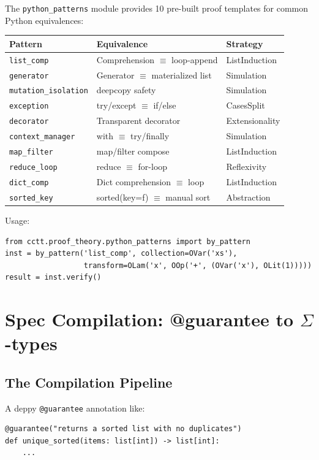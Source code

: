 The \texttt{python\_patterns} module provides 10 pre-built proof templates
for common Python equivalences:

\begin{center}
\begin{tabular}{lll}
\toprule
Pattern & Equivalence & Strategy \\
\midrule
\texttt{list\_comp} & Comprehension $\equiv$ loop-append & ListInduction \\
\texttt{generator} & Generator $\equiv$ materialized list & Simulation \\
\texttt{mutation\_isolation} & deepcopy safety & Simulation \\
\texttt{exception} & try/except $\equiv$ if/else & CasesSplit \\
\texttt{decorator} & Transparent decorator & Extensionality \\
\texttt{context\_manager} & with $\equiv$ try/finally & Simulation \\
\texttt{map\_filter} & map/filter compose & ListInduction \\
\texttt{reduce\_loop} & reduce $\equiv$ for-loop & Reflexivity \\
\texttt{dict\_comp} & Dict comprehension $\equiv$ loop & ListInduction \\
\texttt{sorted\_key} & sorted(key=f) $\equiv$ manual sort & Abstraction \\
\bottomrule
\end{tabular}
\end{center}

Usage:
\begin{lstlisting}
from cctt.proof_theory.python_patterns import by_pattern
inst = by_pattern('list_comp', collection=OVar('xs'),
                  transform=OLam('x', OOp('+', (OVar('x'), OLit(1)))))
result = inst.verify()
\end{lstlisting}


\section{Spec Compilation: @guarantee to $\Sigma$-types}

\subsection{The Compilation Pipeline}

A deppy \texttt{@guarantee} annotation like:

\begin{lstlisting}
@guarantee("returns a sorted list with no duplicates")
def unique_sorted(items: list[int]) -> list[int]:
    ...
\end{lstlisting}

